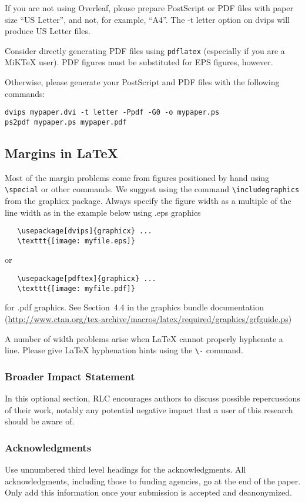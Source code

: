 \documentclass[10pt]{article} %
\begin{document}
If you are not using Overleaf, please prepare PostScript or PDF files with paper size ``US Letter'', and not, for example, ``A4''. The -t letter option on dvips will produce US Letter files.

Consider directly generating PDF files using \verb+pdflatex+ (especially if you are a MiKTeX user). PDF figures must be substituted for EPS figures, however.

Otherwise, please generate your PostScript and PDF files with the following commands:
\begin{verbatim}
dvips mypaper.dvi -t letter -Ppdf -G0 -o mypaper.ps
ps2pdf mypaper.ps mypaper.pdf
\end{verbatim}

\subsection{Margins in LaTeX}
\label{sec:margins}
Most of the margin problems come from figures positioned by hand using \verb+\special+ or other commands. We suggest using the command \verb+\includegraphics+ from the graphicx package. Always specify the figure width as a multiple of the line width as in the example below using .eps graphics
\begin{verbatim}
   \usepackage[dvips]{graphicx} ...
   \texttt{[image: myfile.eps]}
\end{verbatim}
or %
\begin{verbatim}
   \usepackage[pdftex]{graphicx} ...
   \texttt{[image: myfile.pdf]}
\end{verbatim}
for .pdf graphics. See Section~4.4 in the graphics bundle documentation (\url{http://www.ctan.org/tex-archive/macros/latex/required/graphics/grfguide.ps})

A number of width problems arise when LaTeX cannot properly hyphenate a line. Please give LaTeX hyphenation hints using the \verb+\-+ command.

\subsubsection*{Broader Impact Statement}
\label{sec:broaderImpact}
In this optional section, RLC encourages authors to discuss possible repercussions of their work, notably any potential negative impact that a user of this research should be aware of. 

\subsubsection*{Acknowledgments}
\label{sec:ack}
Use unnumbered third level headings for the acknowledgments. All acknowledgments, including those to funding agencies, go at the end of the paper. Only add this information once your submission is accepted and deanonymized. 
\end{document}
